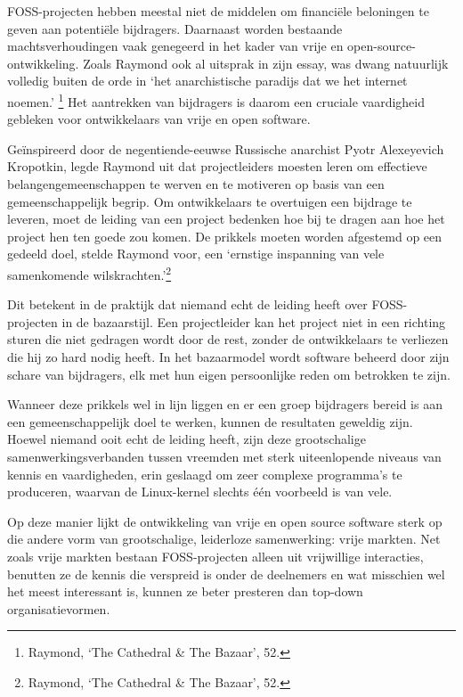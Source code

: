 \documentclass[
  a5paper,
  smalldemyvopaper,11pt,twoside,onecolumn,openright,extrafontsizes]{memoir}
\begin{document}
FOSS-projecten hebben meestal niet de middelen om financiële beloningen
te geven aan potentiële bijdragers. Daarnaast worden bestaande
machtsverhoudingen vaak genegeerd in het kader van vrije en
open-source-ontwikkeling. Zoals Raymond ook al uitsprak in zijn essay,
was dwang natuurlijk volledig buiten de orde in `het anarchistische
paradijs dat we het internet noemen.' \footnote{\hspace{0pt}Raymond,
  `The Cathedral \& The Bazaar', 52.} Het aantrekken van bijdragers is
daarom een cruciale vaardigheid gebleken voor ontwikkelaars van vrije en
open software.

Geïnspireerd door de negentiende-eeuwse Russische anarchist Pyotr
Alexeyevich Kropotkin, legde Raymond uit dat projectleiders moesten
leren om effectieve belangengemeenschappen te werven en te motiveren op
basis van een gemeenschappelijk begrip. Om ontwikkelaars te overtuigen
een bijdrage te leveren, moet de leiding van een project bedenken hoe
bij te dragen aan hoe het project hen ten goede zou komen. De prikkels
moeten worden afgestemd op een gedeeld doel, stelde Raymond voor, een
`ernstige inspanning van vele samenkomende wilskrachten.'\footnote{\hspace{0pt}Raymond,
  `The Cathedral \& The Bazaar', 52.}

Dit betekent in de praktijk dat niemand echt de leiding heeft over
FOSS-projecten in de bazaarstijl. Een projectleider kan het project niet
in een richting sturen die niet gedragen wordt door de rest, zonder de
ontwikkelaars te verliezen die hij zo hard nodig heeft. In het
bazaarmodel wordt software beheerd door zijn schare van bijdragers, elk
met hun eigen persoonlijke reden om betrokken te zijn.

Wanneer deze prikkels wel in lijn liggen en er een groep bijdragers
bereid is aan een gemeenschappelijk doel te werken, kunnen de resultaten
geweldig zijn. Hoewel niemand ooit echt de leiding heeft, zijn deze
grootschalige samenwerkingsverbanden tussen vreemden met sterk
uiteenlopende niveaus van kennis en vaardigheden, erin geslaagd om zeer
complexe programma's te produceren, waarvan de Linux-kernel slechts één
voorbeeld is van vele.

Op deze manier lijkt de ontwikkeling van vrije en open source software
sterk op die andere vorm van grootschalige, leiderloze samenwerking:
vrije markten. Net zoals vrije markten bestaan FOSS-projecten alleen uit
vrijwillige interacties, benutten ze de kennis die verspreid is onder de
deelnemers en wat misschien wel het meest interessant is, kunnen ze
beter presteren dan top-down organisatievormen.
\end{document}
